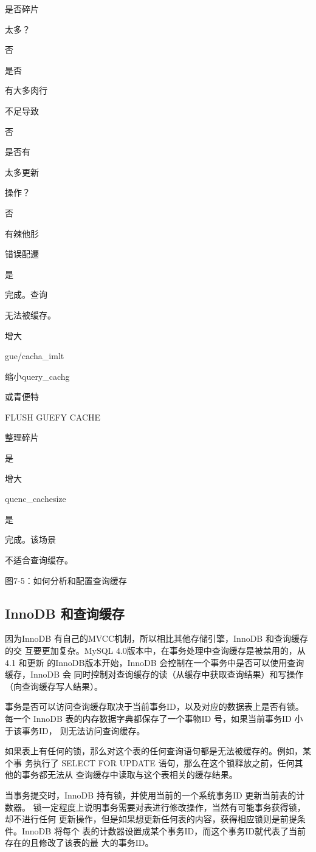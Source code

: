 是否碎片

太多？

否

是否

有大多肉行

不足导致

否

是否有

太多更新

操作？

否

有辣他肜

错误配遷

是

完成。查询

无法被缓存。

增大

gue/cacha\_imlt

缩小query\_cachg

或青便特

FLUSH GUEFY CACHE

整理碎片

是

增大

quenc\_cachesize

是

完成。该场景

不适合查询缓存。

图7-5：如何分析和配置查询缓存

\subsection{InnoDB 和查询缓存}
因为InnoDB 有自己的MVCC机制，所以相比其他存储引擎，InnoDB 和查询缓存的交
互要更加复杂。MySQL 4.0版本中，在事务处理中查询缓存是被禁用的，从4.1 和更新
的InnoDB版本开始，InnoDB 会控制在一个事务中是否可以使用查询缓存，InnoDB 会
同时控制对查询缓存的读（从缓存中获取查询结果）和写操作（向查询缓存写人结果）。

事务是否可以访问查询缓存取决于当前事务ID，以及对应的数据表上是否有锁。每一个
InnoDB 表的内存数据字典都保存了一个事物ID 号，如果当前事务ID 小于该事务ID，
则无法访问查询缓存。

如果表上有任何的锁，那么对这个表的任何查询语句都是无法被缓存的。例如，某个事
务执行了 SELECT FOR UPDATE 语句，那么在这个锁释放之前，任何其他的事务都无法从
查询缓存中读取与这个表相关的缓存结果。

当事务提交时，InnoDB 持有锁，并使用当前的一个系统事务ID 更新当前表的计数器。
锁一定程度上说明事务需要对表进行修改操作，当然有可能事务获得锁，却不进行任何
更新操作，但是如果想更新任何表的内容，获得相应锁则是前提条件。InnoDB 将每个
表的计数器设置成某个事务ID，而这个事务ID就代表了当前存在的且修改了该表的最
大的事务ID。

